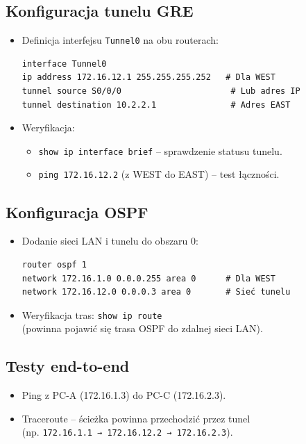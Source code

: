 \documentclass[12pt,twoside,a4paper,openany]{article}
\begin{document}
\subsection{Konfiguracja tunelu GRE}
\begin{itemize}    \item Definicja interfejsu \texttt{Tunnel0} na obu routerach:
    \begin{verbatim}
interface Tunnel0
ip address 172.16.12.1 255.255.255.252   # Dla WEST
tunnel source S0/0/0                      # Lub adres IP
tunnel destination 10.2.2.1               # Adres EAST
    \end{verbatim}
    \item Weryfikacja:
    \begin{itemize}
        \item \texttt{show ip interface brief} – sprawdzenie statusu tunelu.
        \item \texttt{ping 172.16.12.2} (z WEST do EAST) – test łączności.
    \end{itemize}
\end{itemize}

\subsection{Konfiguracja OSPF}
\begin{itemize}
    \item Dodanie sieci LAN i tunelu do obszaru 0:
    \begin{verbatim}
router ospf 1
network 172.16.1.0 0.0.0.255 area 0      # Dla WEST
network 172.16.12.0 0.0.0.3 area 0       # Sieć tunelu
    \end{verbatim}
    \item Weryfikacja tras: \texttt{show ip route}\\ (powinna pojawić się trasa OSPF do zdalnej sieci LAN).
\end{itemize}

\subsection{Testy end-to-end}
\begin{itemize}
    \item Ping z PC-A (172.16.1.3) do PC-C (172.16.2.3).
    \item Traceroute – ścieżka powinna przechodzić przez tunel\\ (np. \texttt{172.16.1.1 → 172.16.12.2 → 172.16.2.3}).
\end{itemize}
\end{document}
